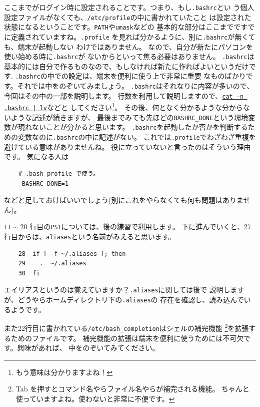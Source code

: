 \documentclass[a4j]{ltjsreport}
\begin{document}
    \vspace*{3mm}

    ここまでがログイン時に設定されることです。つまり、もし\verb+.bashrc+とい
    う個人設定ファイルがなくても、\verb+/etc/profile+の中に書かれていたこと
    は設定された状態になるということです。\verb+PATH+や\verb+umask+などの
    基本的な部分はここまでですでに定義されていますね。\verb+.profile+
    を見れば分かるように、別に\verb+.bashrc+が無くても、端末が起動しない
    わけではありません。
    なので、自分が新たにパソコンを使い始める時に\verb+.bashrc+が
    ないからといって焦る必要はありません。
    \verb+.bashrc+は基本的には自分で作るものなので、もしなければ新たに作ればよいというだけです.
    \verb+.bashrc+の中での設定は、端末を便利に使う上で非常に重要
    なものばかりです。それでは中をのぞいてみましょう。
    \verb+.bashrc+はそれなりに内容が多いので、今回はその中の一部を説明します。
    行数を利用して説明しますので、\underline{\texttt{cat -n .bashrc | lv}}などと
    してください\footnote{もう意味は分かりますよね！}。
    その後、何となく分かるような分からないような記述が続きますが、
    最後までみても先ほどの\verb+BASHRC_DONE+という環境変数が現れないことが分かると思います。
    \verb+.bashrc+を起動したか否かを判断するための変数なのに\verb+.bashrc+の中に記述がない。
    これでは\verb+.profile+でわざわざ重複を避けている意味がありませんね。
    役に立っていないと言ったのはそういう理由です。
    気になる人は
    \begin{verbatim}
    # .bash_profile で使う。
     BASHRC_DONE=1
    \end{verbatim}
    などと足しておけばいいでしょう(別にこれをやらなくても何も問題はありません)。

    $11 \sim 20$ 行目の\verb+PS1+については、後の練習で利用します。
    下に進んでいくと、27 行目からは、\verb+aliases+という名前がみえると思います。
    \begin{verbatim}
    28  if [ -f ~/.aliases ]; then
    29    .  ~/.aliases
    30  fi
    \end{verbatim}
    エイリアスというのは覚えていますか？\verb+.aliases+に関しては後で
    説明しますが、どうやらホームディレクトリ下の\verb+.aliases+の
    存在を確認し、読み込んでいるようです。

    また22行目に書かれている\verb+/etc/bash_completion+はシェルの補完機能
    \footnote{Tab を押すとコマンド名やらファイル名やらが補完される機能。
    ちゃんと使っていますよね。使わないと非常に不便です。}を拡張するためのファイルです。
    補完機能の拡張は端末を便利に使うためには不可欠です。興味があれば、
    中をのぞいてみてください。
\end{document}
